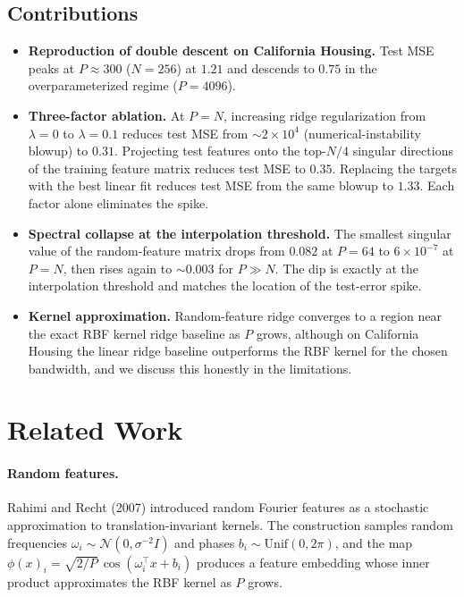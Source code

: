 \documentclass{article}
\begin{document}
\subsection{Contributions}
\begin{itemize}
  \item \textbf{Reproduction of double descent on California Housing.} Test MSE peaks at $P \approx 300$ ($N = 256$) at $1.21$ and descends to $0.75$ in the overparameterized regime ($P = 4096$).
  \item \textbf{Three-factor ablation.} At $P = N$, increasing ridge regularization from $\lambda = 0$ to $\lambda = 0.1$ reduces test MSE from $\sim 2 \times 10^4$ (numerical-instability blowup) to $0.31$. Projecting test features onto the top-$N/4$ singular directions of the training feature matrix reduces test MSE to $0.35$. Replacing the targets with the best linear fit reduces test MSE from the same blowup to $1.33$. Each factor alone eliminates the spike.
  \item \textbf{Spectral collapse at the interpolation threshold.} The smallest singular value of the random-feature matrix drops from $0.082$ at $P = 64$ to $6 \times 10^{-7}$ at $P = N$, then rises again to $\sim 0.003$ for $P \gg N$. The dip is exactly at the interpolation threshold and matches the location of the test-error spike.
  \item \textbf{Kernel approximation.} Random-feature ridge converges to a region near the exact RBF kernel ridge baseline as $P$ grows, although on California Housing the linear ridge baseline outperforms the RBF kernel for the chosen bandwidth, and we discuss this honestly in the limitations.
\end{itemize}

\section{Related Work}

\paragraph{Random features.}
Rahimi and Recht (2007) introduced random Fourier features as a stochastic approximation to translation-invariant kernels. The construction samples random frequencies $\omega_i \sim \mathcal{N}(0, \sigma^{-2} I)$ and phases $b_i \sim \mathrm{Unif}(0, 2\pi)$, and the map $\phi(x)_i = \sqrt{2/P}\, \cos(\omega_i^\top x + b_i)$ produces a feature embedding whose inner product approximates the RBF kernel as $P$ grows.
\end{document}
